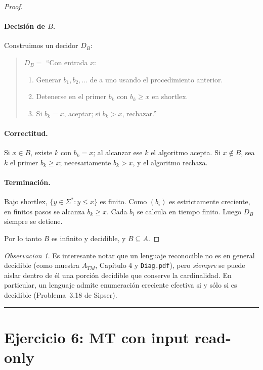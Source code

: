 \documentclass[11pt,a4paper]{article}
\theoremstyle{plain}
\theoremstyle{definition}
\theoremstyle{remark}
\newtheorem*{observacion}{Observacion}
\newcommand{\Sstar}{\Sigma^{*}}
\begin{document}
\begin{proof}
\paragraph{Decisi\'on de $B$.}
Construimos un decidor $D_B$:
\begin{quote}
\(D_B=\) ``Con entrada $x$:
\begin{enumerate}
  \item Generar $b_1, b_2, \dots$ de a uno usando el procedimiento anterior.
  \item Detenerse en el primer $b_k$ con $b_k\ge x$ en shortlex.
  \item Si $b_k=x$, aceptar; si $b_k>x$, rechazar.''
\end{enumerate}
\end{quote}

\paragraph{Correctitud.}
Si $x\in B$, existe $k$ con $b_k=x$; al alcanzar ese $k$ el algoritmo
acepta. Si $x\notin B$, sea $k$ el primer $b_k\ge x$; necesariamente
$b_k>x$, y el algoritmo rechaza.

\paragraph{Terminaci\'on.}
Bajo shortlex, $\{y\in\Sstar : y\le x\}$ es finito. Como $(b_i)$ es
estrictamente creciente, en finitos pasos se alcanza $b_k\ge x$. Cada $b_i$
se calcula en tiempo finito. Luego $D_B$ siempre se detiene.

Por lo tanto $B$ es infinito y decidible, y $B\subseteq A$.
\end{proof}

\begin{observacion}
Es interesante notar que un lenguaje reconocible no es en general decidible
(como muestra $A_{TM}$, Cap\'itulo 4 y \texttt{Diag.pdf}), pero \emph{siempre}
se puede aislar dentro de \'el una porci\'on decidible que conserve la
cardinalidad. En particular, un lenguaje admite enumeraci\'on creciente
efectiva si y s\'olo si es decidible (Problema~3.18 de Sipser).
\end{observacion}

\bigskip\hrule\bigskip

\section{Ejercicio 6: MT con input read-only}
\label{sec:ej6}
\end{document}
